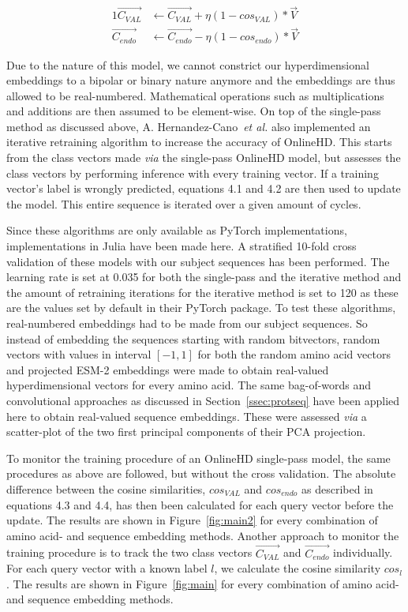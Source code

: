 \begin{alignat}{1}
    \label{eqn:onlinehd2}
    \vec{C_{VAL}} &\leftarrow \vec{C_{VAL}} + \eta (1 - cos_{VAL}) * \vec{V} \\
    \vec{C_{endo}} &\leftarrow \vec{C_{endo}} - \eta (1 - cos_{endo}) * \vec{V}
\end{alignat}

Due to the nature of this model, we cannot constrict our hyperdimensional embeddings to a bipolar or binary nature anymore and the embeddings are thus allowed to be real-numbered. Mathematical operations such as multiplications and additions are then assumed to be element-wise. On top of the single-pass method as discussed above, A. Hernandez-Cano~\textit{et al.} also implemented an iterative retraining algorithm to increase the accuracy of OnlineHD. This starts from the class vectors made \textit{via} the single-pass OnlineHD model, but assesses the class vectors by performing inference with every training vector. If a training vector's label is wrongly predicted, equations 4.1 and 4.2 are then used to update the model. This entire sequence is iterated over a given amount of cycles.

Since these algorithms are only available as PyTorch implementations, implementations in Julia have been made here. A stratified 10-fold cross validation of these models with our subject sequences has been performed. The learning rate is set at 0.035 for both the single-pass and the iterative method and the amount of retraining iterations for the iterative method is set to 120 as these are the values set by default in their PyTorch package. To test these algorithms, real-numbered embeddings had to be made from our subject sequences. So instead of embedding the sequences starting with random bitvectors, random vectors with values in interval $[-1, 1]$ for both the random amino acid vectors and projected ESM-2 embeddings were made to obtain real-valued hyperdimensional vectors for every amino acid. The same bag-of-words and convolutional approaches as discussed in Section~\ref{ssec:protseq} have been applied here to obtain real-valued sequence embeddings. These were assessed \textit{via} a scatter-plot of the two first principal components of their PCA projection.

To monitor the training procedure of an OnlineHD single-pass model, the same procedures as above are followed, but without the cross validation. The absolute difference between the cosine similarities, $cos_{VAL}$ and $cos_{endo}$ as described in equations 4.3 and 4.4, has then been calculated for each query vector before the update. The results are shown in Figure~\ref{fig:main2} for every combination of amino acid- and sequence embedding methods. Another approach to monitor the training procedure is to track the two class vectors $\vec{C_{VAL}}$ and $\vec{C_{endo}}$ individually. For each query vector with a known label $l$, we calculate the cosine similarity $cos_{l}$. The results are shown in Figure~\ref{fig:main} for every combination of amino acid- and sequence embedding methods. 

